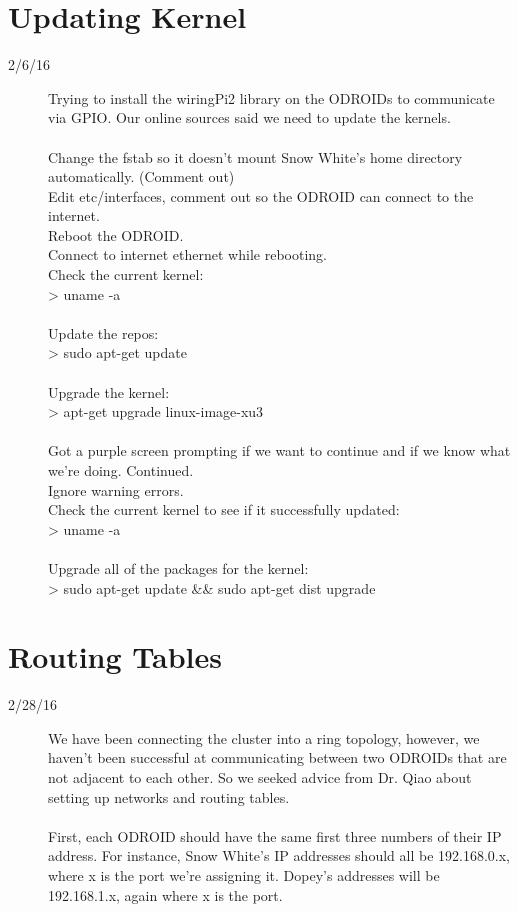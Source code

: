 \section{Updating Kernel}
\begin{description}
\item [2/6/16] Trying to install the wiringPi2 library on the ODROIDs to communicate via GPIO. Our online sources said we need to update the kernels. \\ \\
Change the fstab so it doesn't mount Snow White's home directory automatically. (Comment out) \\
Edit etc/interfaces, comment out so the ODROID can connect to the internet.\\
Reboot the ODROID.\\
Connect to internet ethernet while rebooting. \\
Check the current kernel: \\
> uname -a \\ \\
Update the repos: \\
> sudo apt-get update \\ \\
Upgrade the kernel: \\
> apt-get upgrade linux-image-xu3 \\ \\
Got a purple screen prompting if we want to continue and if we know what we're doing. Continued. \\
Ignore warning errors. \\
Check the current kernel to see if it successfully updated: \\
> uname -a \\ \\
Upgrade all of the packages for the kernel: \\
> sudo apt-get update \&\& sudo apt-get dist upgrade
\end{description}

\section{Routing Tables}
\begin{description}
\item [2/28/16] We have been connecting the cluster into a ring topology, however, we haven't been successful at communicating between two ODROIDs that are not adjacent to each other. So we seeked advice from Dr. Qiao about setting up networks and routing tables. \\ \\
First, each ODROID should have the same first three numbers of their IP address. For instance, Snow White's IP addresses should all be 192.168.0.x, where x is the port we're assigning it. Dopey's addresses will be 192.168.1.x, again where x is the port.
\end{description}